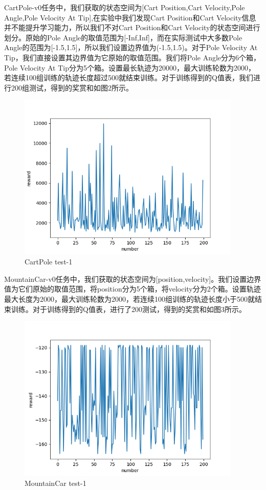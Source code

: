\documentclass[a4paper,UTF8]{article}
\theoremstyle{definition}
\begin{document}
	CartPole-v0任务中，我们获取的状态空间为[Cart Position,Cart Velocity,Pole Angle,Pole Velocity At Tip],在实验中我们发现Cart Position和Cart Velocity信息并不能提升学习能力，所以我们不对Cart Position和Cart Velocity的状态空间进行划分。原始的Pole Angle的取值范围为[-Inf,Inf]，而在实际测试中大多数Pole Angle的范围为[-1.5,1.5]，所以我们设置边界值为(-1.5,1.5)。对于Pole Velocity At Tip，我们直接设置其边界值为它原始的取值范围。我们将Pole Angle分为6个箱，Pole Velocity At Tip分为5个箱。设置最长轨迹为20000，最大训练轮数为2000，若连续100组训练的轨迹长度超过500就结束训练。对于训练得到的Q值表，我们进行200组测试，得到的奖赏和如图2所示。
\begin{figure}[!h]
\centering
\small
\includegraphics[height=8cm]{CartPole-1.png}
\caption{CartPole test-1}
\end{figure}

	MountainCar-v0任务中，我们获取的状态空间为[position,velocity]。我们设置边界值为它们原始的取值范围，将position分为5个箱，将velocity分为2个箱。设置轨迹最大长度为2000，最大训练轮数为2000，若连续100组训练的轨迹长度小于500就结束训练。对于训练得到的Q值表，进行了200测试，得到的奖赏和如图3所示。 
\begin{figure}[!h]
\centering
\small
\includegraphics[height=8cm]{MountainCar-1.png}
\caption{MountainCar test-1}
\end{figure}
\end{document}
